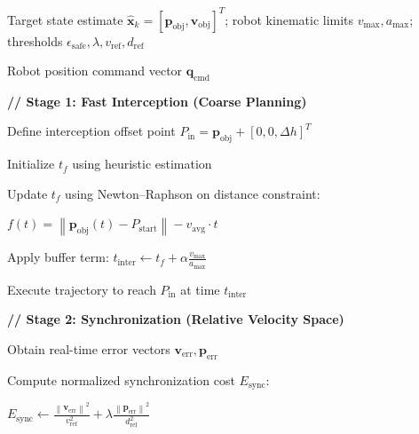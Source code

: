  

\begin{algorithm}[t]
\caption{Two-Stage Dynamic Grasping Planning Strategy}
\label{algo:two_stage_dynamic_grasping}
\begin{algorithmic}[1]

\Require Target state estimate
$\hat{\mathbf{x}}_k=
[\mathbf{p}_{\text{obj}},\mathbf{v}_{\text{obj}}]^{T}$;
robot kinematic limits $v_{\text{max}},a_{\text{max}}$;
thresholds $\epsilon_{\text{safe}},\lambda,v_{\text{ref}},d_{\text{ref}}$

\Ensure Robot position command vector $\mathbf{q}_{\text{cmd}}$

\State \textbf{// Stage 1: Fast Interception (Coarse Planning)}

\State Define interception offset point
$P_{\text{in}}=\mathbf{p}_{\text{obj}}+[0,0,\Delta h]^{T}$

\State Initialize $t_f$ using heuristic estimation

\Repeat

    \State Update $t_f$ using Newton--Raphson on distance constraint:

    \State
    $f(t)=
    \left\|
    \mathbf{p}_{\text{obj}}(t)-P_{\text{start}}
    \right\|
    -
    v_{\text{avg}}\cdot t$


\State Apply buffer term:
$t_{\text{inter}}\gets t_f+\alpha\frac{v_{\text{max}}}{a_{\text{max}}}$

\State Execute trajectory to reach $P_{\text{in}}$ at time $t_{\text{inter}}$

\State \textbf{// Stage 2: Synchronization (Relative Velocity Space)}


    \State Obtain real-time error vectors
    $\mathbf{v}_{\text{err}},\mathbf{p}_{\text{err}}$

    \State Compute normalized synchronization cost $E_{\text{sync}}$:

    \State
    $E_{\text{sync}}
    \gets
    \frac{\left\|\mathbf{v}_{\text{err}}\right\|^2}{v_{\text{ref}}^{2}}
    +
    \lambda
    \frac{\left\|\mathbf{p}_{\text{err}}\right\|^2}{d_{\text{ref}}^{2}}$


\end{algorithmic}
\end{algorithm}
